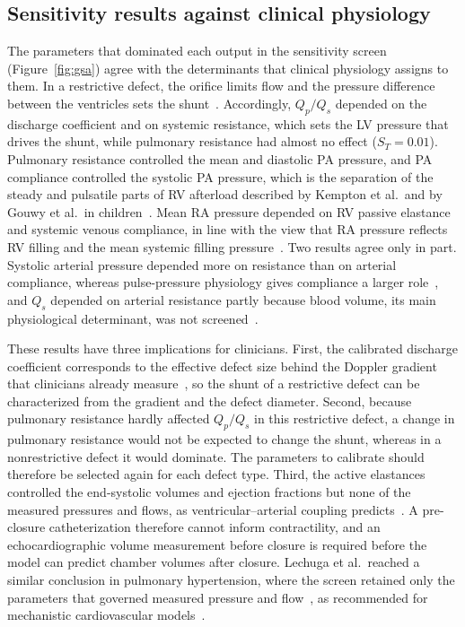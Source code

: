 \subsection{Sensitivity results against clinical physiology}
\label{sec:disc_gsa}
The parameters that dominated each output in the sensitivity screen (Figure~\ref{fig:gsa}) agree with the determinants that clinical physiology assigns to them. In a restrictive defect, the orifice limits flow and the pressure difference between the ventricles sets the shunt~\cite{Rao2024,Haas_2024}. Accordingly, $Q_p/Q_s$ depended on the discharge coefficient and on systemic resistance, which sets the LV pressure that drives the shunt, while pulmonary resistance had almost no effect ($S_T = 0.01$). Pulmonary resistance controlled the mean and diastolic PA pressure, and PA compliance controlled the systolic PA pressure, which is the separation of the steady and pulsatile parts of RV afterload described by Kempton et al.\ and by Gouwy et al.\ in children~\cite{Kempton2025,Gouwy2025}. Mean RA pressure depended on RV passive elastance and systemic venous compliance, in line with the view that RA pressure reflects RV filling and the mean systemic filling pressure~\cite{Persichini2022}. Two results agree only in part. Systolic arterial pressure depended more on resistance than on arterial compliance, whereas pulse-pressure physiology gives compliance a larger role~\cite{FloresGeronimo2021}, and $Q_s$ depended on arterial resistance partly because blood volume, its main physiological determinant, was not screened~\cite{Persichini2022}.

These results have three implications for clinicians. First, the calibrated discharge coefficient corresponds to the effective defect size behind the Doppler gradient that clinicians already measure~\cite{Uppu2022}, so the shunt of a restrictive defect can be characterized from the gradient and the defect diameter. Second, because pulmonary resistance hardly affected $Q_p/Q_s$ in this restrictive defect, a change in pulmonary resistance would not be expected to change the shunt, whereas in a nonrestrictive defect it would dominate. The parameters to calibrate should therefore be selected again for each defect type. Third, the active elastances controlled the end-systolic volumes and ejection fractions but none of the measured pressures and flows, as ventricular--arterial coupling predicts~\cite{Vriz2021}. A pre-closure catheterization therefore cannot inform contractility, and an echocardiographic volume measurement before closure is required before the model can predict chamber volumes after closure. Lechuga et al.\ reached a similar conclusion in pulmonary hypertension, where the screen retained only the parameters that governed measured pressure and flow~\cite{Lechuga2026}, as recommended for mechanistic cardiovascular models~\cite{Colebank2024Guidelines}.

